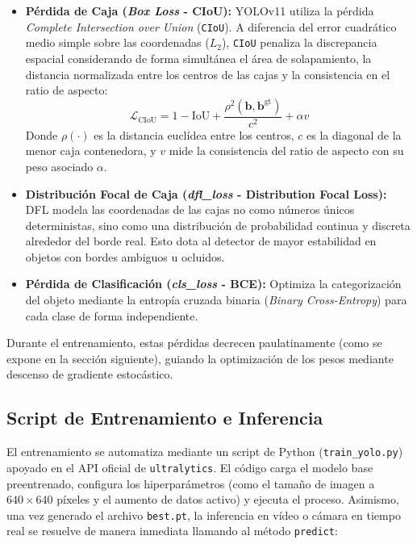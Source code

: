 \documentclass[12pt,a4paper]{article}
\begin{document}
\begin{itemize}
    \item \textbf{Pérdida de Caja (\textit{Box Loss} - CIoU):} YOLOv11 utiliza la pérdida \textit{Complete Intersection over Union} (\texttt{CIoU}). A diferencia del error cuadrático medio simple sobre las coordenadas ($L_2$), \texttt{CIoU} penaliza la discrepancia espacial considerando de forma simultánea el área de solapamiento, la distancia normalizada entre los centros de las cajas y la consistencia en el ratio de aspecto:
    \begin{equation}
        \mathcal{L}_{\text{CIoU}} = 1 - \text{IoU} + \frac{\rho^2(\mathbf{b}, \mathbf{b}^{\text{gt}})}{c^2} + \alpha v
    \end{equation}
    Donde $\rho(\cdot)$ es la distancia euclídea entre los centros, $c$ es la diagonal de la menor caja contenedora, y $v$ mide la consistencia del ratio de aspecto con su peso asociado $\alpha$.
    
    \item \textbf{Distribución Focal de Caja (\textit{dfl\_loss} - Distribution Focal Loss):} DFL modela las coordenadas de las cajas no como números únicos deterministas, sino como una distribución de probabilidad continua y discreta alrededor del borde real. Esto dota al detector de mayor estabilidad en objetos con bordes ambiguos u ocluidos.
    
    \item \textbf{Pérdida de Clasificación (\textit{cls\_loss} - BCE):} Optimiza la categorización del objeto mediante la entropía cruzada binaria (\textit{Binary Cross-Entropy}) para cada clase de forma independiente.
\end{itemize}

Durante el entrenamiento, estas pérdidas decrecen paulatinamente (como se expone en la sección siguiente), guiando la optimización de los pesos mediante descenso de gradiente estocástico.

\subsection{Script de Entrenamiento e Inferencia}
El entrenamiento se automatiza mediante un script de Python (\texttt{train\_yolo.py}) apoyado en el API oficial de \texttt{ultralytics}. El código carga el modelo base preentrenado, configura los hiperparámetros (como el tamaño de imagen a $640\times640$ píxeles y el aumento de datos activo) y ejecuta el proceso. Asimismo, una vez generado el archivo \texttt{best.pt}, la inferencia en vídeo o cámara en tiempo real se resuelve de manera inmediata llamando al método \texttt{predict}:
\end{document}
